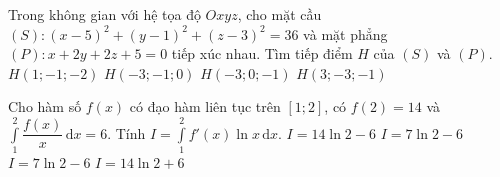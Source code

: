 \begin{ex}%
	Trong không gian với hệ tọa độ $Oxyz$, cho mặt cầu $(S)\colon (x - 5)^2 + (y - 1)^2 + (z - 3)^2=36$ và mặt phẳng $(P)\colon x + 2y + 2z + 5=0$ tiếp xúc nhau. Tìm tiếp điểm $H$ của $(S)$ và $(P)$. 
	\choice
	{$H\left(1; - 1; - 2\right)$}
	{$H\left(- 3; - 1; 0\right)$}
	{$H\left(- 3; 0; - 1\right)$}
	{\True $H\left(3; - 3; - 1\right)$}
	
\end{ex}

\begin{ex}%
	Cho hàm số $f(x)$ có đạo hàm liên tục trên $[1; 2]$, có $f\left(2\right)=14$ và $\displaystyle\int\limits_1^2{\dfrac{f(x)}{x}\mathrm{\,d}x=6}$. Tính $I=\displaystyle\int\limits_1^2{f'(x)}\ln x\mathrm{\,d}x$. 
	\choice
	{\True $I=14\ln 2 - 6$}
	{$I=7\ln 2 - 6$}
	{$I=7\ln 2 - 6$}
	{$I=14\ln 2 + 6$}
\end{ex}

